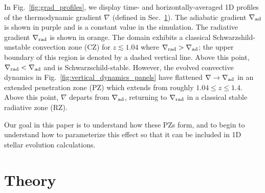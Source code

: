 \documentclass[twocolumn]{aastex631}
\newcommand{\gradrad}{\ensuremath{\nabla_{\rm{rad}}}}
\newcommand{\gradad}{\ensuremath{\nabla_{\rm{ad}}}}
\newcommand{\justgrad}{\ensuremath{\nabla}}
\begin{document}
In Fig.~\ref{fig:grad_profiles}, we display time- and horizontally-averaged 1D profiles of the thermodynamic gradient $\justgrad$ (defined in Sec.~\ref{sec:theory}).
The adiabatic gradient $\gradad$ is shown in purple and is a constant value in the simulation.
The radiative gradient $\gradrad$ is shown in orange.
The domain exhibits a classical Schwarzshild-unstable convection zone (CZ) for $z \lesssim 1.04$ where $\gradrad > \gradad$; the upper boundary of this region is denoted by a dashed vertical line.
Above this point, $\gradrad < \gradad$ and is Schwarzschild-stable.
However, the evolved convective dynamics in Fig.~\ref{fig:vertical_dynamics_panels} have flattened $\justgrad \rightarrow \gradad$ in an extended penetration zone (PZ) which extends from roughly $1.04 \leq z \leq 1.4$.
Above this point, $\justgrad$ departs from $\gradad$, returning to $\gradrad$ in a classical stable radiative zone (RZ).

Our goal in this paper is to understand how these PZs form, and to begin to understand how to parameterize this effect so that it can be included in 1D stellar evolution calculations.

\section{Theory}
\label{sec:theory}
\end{document}
